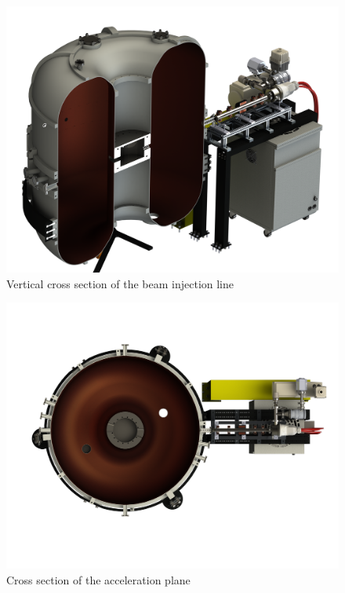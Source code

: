 \documentclass[a4paper,oneside,12pt]{report}
\numberwithin{equation}{chapter}
\begin{document}
\begin{figure}
    \centering
    \includegraphics[width=\linewidth]{./figures/design/final_design_2.png}
    \caption{Vertical cross section of the beam injection line}
\end{figure}

\begin{figure}
    \centering
    \includegraphics[angle=90, origin=c, width=\linewidth]{./figures/design/final_design_3.png}
    \caption{Cross section of the acceleration plane}
\end{figure}


\newpage
\end{document}
